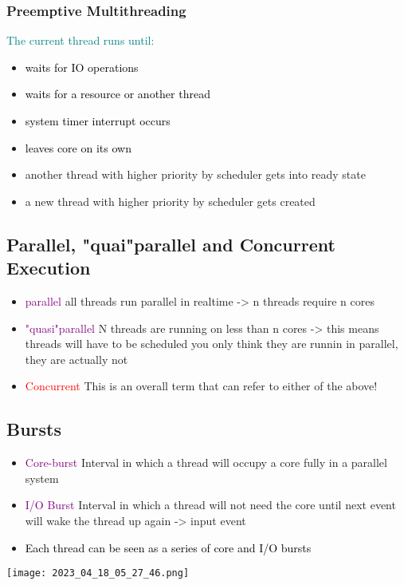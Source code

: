 \documentclass[main.tex,fontsize=8pt,paper=a4,paper=portrait,DIV=calc,]{scrartcl}
\begin{document}
\subsubsection{Preemptive Multithreading}
\textcolor{teal}{The current thread runs until:}
\begin{itemize}
\item \textcolor{black}{waits for IO operations}
\item \textcolor{black}{waits for a resource or another thread}
\item \textcolor{black}{system timer interrupt occurs}
\item \textcolor{black}{leaves core on its own}
\item another thread with higher priority by scheduler gets into ready state
\item a new thread with higher priority by scheduler gets created
\end{itemize} 

\subsection{Parallel, "quai"parallel and Concurrent Execution}
\begin{itemize}
\item \textcolor{purple}{parallel}\newline
  all threads run parallel in realtime -> n threads require n cores
\item \textcolor{purple}{"quasi"parallel}\newline
  N threads are running on less than n cores -> this means threads will have to be scheduled\newline
  you only think they are runnin in parallel, they are actually not
\item \textcolor{red}{Concurrent} This is an overall term that can refer to either of the above!
\end{itemize} 

\subsection{Bursts}
\begin{itemize}
\item \textcolor{purple}{Core-burst}\newline
  Interval in which a thread will occupy a core fully in a parallel system
\item \textcolor{purple}{I/O Burst}\newline
  Interval in which a thread will not need the core until next event will wake the thread up again -> input event
\item \textcolor{black}{Each thread can be seen as a series of core and I/O bursts}
\end{itemize} 
\texttt{[image: 2023\_04\_18\_05\_27\_46.png]}
\end{document}
